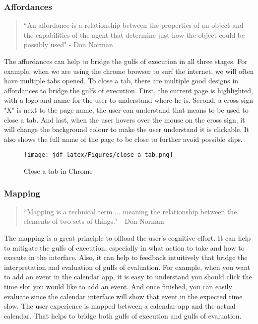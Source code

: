 \documentclass[
	letterpaper, %
]{jdf}
\begin{document}
\subsubsection{Affordances}
\begin{quotation}
\noindent “An affordance is a relationship between the properties of an object and the capabilities of the agent that determine just how the object could be possibly used"
- Don Norman
\end{quotation}

The affordances can help to bridge the gulfs of execution in all three stages. For example, when we are using the chrome browser to surf the internet, we will often have multiple tabs opened. To close a tab, there are multiple good designs in affordances to bridge the gulfs of execution. First, the current page is highlighted, with a logo and name for the user to understand where he is. Second, a cross sign "X" is next to the page name, the user can understand that means to be used to close a tab. And last, when the user hovers over the mouse on the cross sign, it will change the background colour to make the user understand it is clickable. It also shows the full name of the page to be close to further avoid possible slips.

\begin{figure}[h]
	\centering
	\texttt{[image: jdf-latex/Figures/close a tab.png]}
	\caption{Close a tab in Chrome}
	\label{fig:closeatab}
\end{figure}

\subsubsection{Mapping}
\begin{quotation}
\noindent “Mapping is a technical term ... meaning the relationship between the elements of two sets of things."
- Don Norman
\end{quotation}

The mapping is a great principle to offload the user's cognitive effort. It can help to mitigate the gulfs of execution, especially in what action to take and how to execute in the interface. Also, it can help to feedback intuitively that bridge the interpretation and evaluation of gulfs of evaluation. For example, when you want to add an event in the calendar app, it is easy to understand you should click the time slot you would like to add an event. And once finished, you can easily evaluate since the calendar interface will show that event in the expected time slow. The user experience is mapped between a calendar app and the actual calendar. That helps to bridge both gulfs of execution and gulfs of evaluation.
\end{document}
